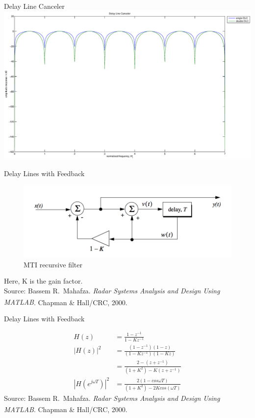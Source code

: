 \documentclass[mathserif]{beamer}
\begin{document}
    \begin{frame}{Delay Line Canceler}
    	\includegraphics[width=\linewidth]{delayLineCanceler}
    \end{frame}
    
    
    
    \begin{frame}{Delay Lines with Feedback}
      \begin{minipage}[t][0.8\textheight][t]{\textwidth}
	\begin{figure}[h]
		\centering
		\includegraphics[width=0.8\linewidth]{feedbackDLC} 
		\caption{MTI recursive filter}
	\end{figure}
	\vfill
	\tiny{Here, K is the gain factor.} \\
    	\tiny{Source: Bassem R.~Mahafza. \emph{Radar Systems Analysis and Design Using MATLAB\textsuperscript{\textregistered}}. Chapman \& Hall/CRC, 2000.}
      \end{minipage}
    \end{frame}
    
    
    
    \begin{frame}{Delay Lines with Feedback}
      \begin{minipage}[t][0.8\textheight][t]{\textwidth}
	\begin{align}
	  H(z) & = \frac{1 - z^{-1}}{1-Kz^{-1}} \nonumber \\
	  |H(z)|^2 & = \frac{(1-z^{-1})(1-z)}{(1-Kz^{-1})(1-Kz)} \nonumber \\
	  & = \frac{2-(z+z^{-1})}{(1+K^2)-K(z+z^{-1})} \nonumber \\
	  \left|{H(e^{j\omega T})}\right|^2 & = \frac{2(1-cos\omega T)}{(1+K^2)-2Kcos(\omega T)} \nonumber
	\end{align}
	\vfill
	\tiny{Source: Bassem R.~Mahafza. \emph{Radar Systems Analysis and Design Using MATLAB\textsuperscript{\textregistered}}. Chapman \& Hall/CRC, 2000.}
      \end{minipage}
    \end{frame}
    
\end{document}
